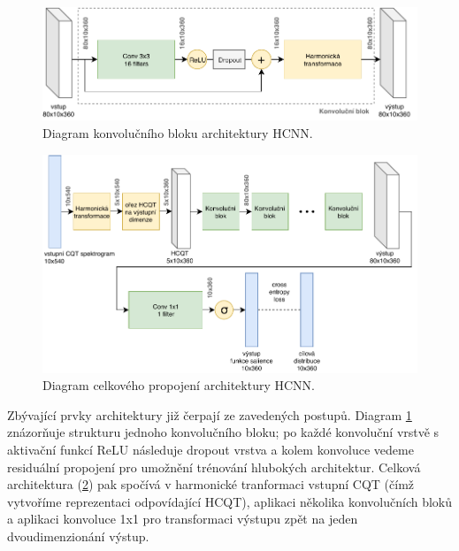 
\begin{figure}[h]\centering
    \includegraphics[width=\textwidth,height=\textheight,keepaspectratio]{../img/hcnn_layer}
\caption{Diagram konvolučního bloku architektury HCNN.}\label{obr:hcnn_layer}
\end{figure}

\begin{figure}[h]\centering
    \includegraphics[width=\textwidth,height=\textheight,keepaspectratio]{../img/hcnn_arch}
\caption{Diagram celkového propojení architektury HCNN.}\label{obr:hcnn_arch}
\end{figure}

Zbývající prvky architektury již čerpají ze zavedených postupů. Diagram \ref{obr:hcnn_layer} znázorňuje strukturu jednoho konvolučního bloku; po každé konvoluční vrstvě s aktivační funkcí ReLU následuje dropout vrstva a kolem konvoluce vedeme residuální propojení pro umožnění trénování hlubokých architektur. Celková architektura (\ref{obr:hcnn_arch}) pak spočívá v harmonické tranformaci vstupní CQT (čímž vytvoříme reprezentaci odpovídající HCQT), aplikaci několika konvolučních bloků a aplikaci konvoluce 1x1 pro transformaci výstupu zpět na jeden dvoudimenzionání výstup.


